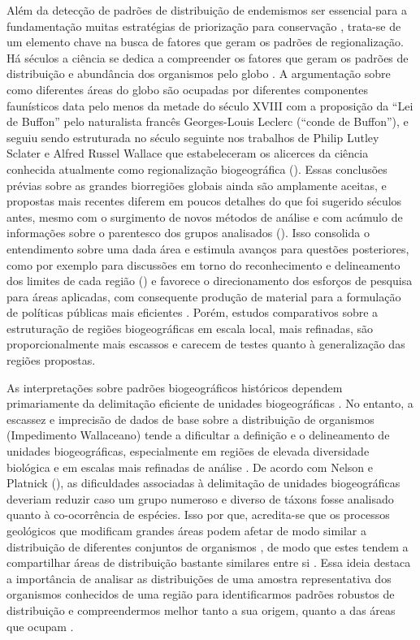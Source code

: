 \documentclass[12pt,openright,oneside,a4paper,english]{abntex2}
\begin{document}
Além da detecção de padrões de distribuição de endemismos ser essencial para a fundamentação muitas estratégias de priorização para conservação \citep{Brooks2006}, trata-se de um elemento chave na busca de fatores que geram os padrões de regionalização. Há séculos a ciência se dedica a compreender os fatores que geram os padrões de distribuição e abundância dos organismos pelo globo \citep{Brown1995}. A argumentação sobre como diferentes áreas do globo são ocupadas por diferentes componentes faunísticos data pelo menos da metade do século XVIII com a proposição da “Lei de Buffon” pelo naturalista francês Georges-Louis Leclerc (“conde de Buffon”), e seguiu sendo estruturada no século seguinte nos trabalhos de Philip Lutley Sclater e Alfred Russel Wallace que estabeleceram os alicerces da ciência conhecida atualmente como regionalização biogeográfica (\citealp[ver][]{Cox2016}). Essas conclusões prévias sobre as grandes biorregiões globais ainda são amplamente aceitas, e propostas mais recentes diferem em poucos detalhes do que foi sugerido séculos antes, mesmo com o surgimento de novos métodos de análise e com acúmulo de informações sobre o parentesco dos grupos analisados (\citealp[e.g.][]{Holt2013}). Isso consolida o entendimento sobre uma dada área e estimula avanços para questões posteriores, como por exemplo para discussões em torno do reconhecimento e delineamento dos limites de cada região (\citealp[e.g.][]{Ficetola2017, Morrone2018}) e favorece o direcionamento dos esforços de pesquisa para áreas aplicadas, com consequente produção de material para a formulação de políticas públicas mais eficientes \citep{Brooks2004, Whittaker2005}. Porém, estudos comparativos sobre a estruturação de regiões biogeográficas em escala local, mais refinadas, são proporcionalmente mais escassos e carecem de testes quanto à generalização das regiões propostas.

As interpretações sobre padrões biogeográficos históricos dependem primariamente da delimitação eficiente de unidades biogeográficas \citep{Hausdorf2002}. No entanto, a escassez e imprecisão de dados de base sobre a distribuição de organismos (Impedimento Wallaceano) tende a dificultar a definição e o delineamento de unidades biogeográficas, especialmente em regiões de elevada diversidade biológica \citep{Ficetola2014} e em escalas mais refinadas de análise \citep{Whittaker2005}. De acordo com Nelson e Platnick (\citeyear{Nelson1981}), as dificuldades associadas à delimitação de unidades biogeográficas deveriam reduzir caso um grupo numeroso e diverso de táxons fosse analisado quanto à co-ocorrência de espécies. Isso por que, acredita-se que os processos geológicos que modificam grandes áreas podem afetar de modo similar a distribuição de diferentes conjuntos de organismos \citep{Wiley1988}, de modo que estes tendem a compartilhar áreas de distribuição bastante similares entre si \citep{Hausdorf2002}. Essa ideia destaca a importância de analisar as distribuições de uma amostra representativa dos organismos conhecidos de uma região para identificarmos padrões robustos de distribuição e compreendermos melhor tanto a sua origem, quanto a das áreas que ocupam \citep{Wiley1988, Morrone2002}.
\end{document}
